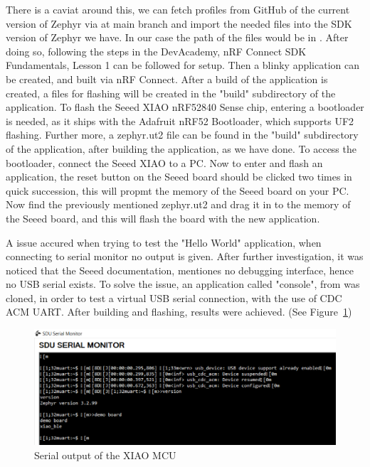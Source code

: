 There is a caviat around this, we can fetch profiles from GitHub of the current version of Zephyr via  at main branch \cite{gitZephyr} and import the needed files into the SDK version of Zephyr we have.
In our case the path of the files would be in  .
After doing so, following the steps in the DevAcademy, nRF Connect SDK Fundamentals, Lesson 1 can be followed for setup. Then a blinky application can be created, and built via nRF Connect.
After a build of the application is created, a files for flashing will be created in the "build" subdirectory of the application.
To flash the Seeed XIAO nRF52840 Sense chip, entering a bootloader is needed, as it ships with the Adafruit nRF52 Bootloader, which supports UF2 flashing. \cite{docsZephyr}
Further more, a zephyr.ut2 file can be found in the "build" subdirectory of the application, after building the application, as we have done.
To access the bootloader, connect the Seeed XIAO to a PC.
Now to enter and flash an application, the reset button on the Seeed board should be clicked two times in quick succession, this will propmt the memory of the Seeed board on your PC.
Now find the previously mentioned zephyr.ut2 and drag it in to the memory of the Seeed board, and this will flash the board with the new application.

A issue accured when trying to test the "Hello World" application, when connecting to serial monitor no output is given.
After further investigation, it was noticed that the Seeed documentation, mentiones no debugging interface, hence no USB serial exists.
To solve the issue, an application called "console", from  was cloned, in order to test a virtual USB serial connection, with the use of CDC ACM UART. \cite{gitZephyr}
After building and flashing, results were achieved. (See Figure~\ref{fig:serial})

\begin{figure}[H]
    \centering
    \includegraphics[scale = 0.7]{pictures/serial_monitor.png}
    \caption{Serial output of the XIAO MCU}
    \label{fig:serial}
\end{figure}

